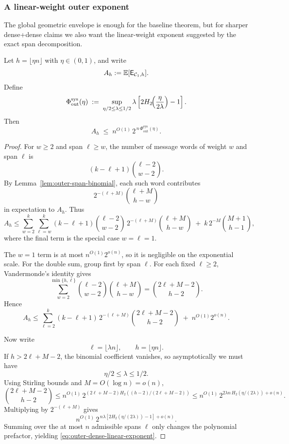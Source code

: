 \subsubsection{A linear-weight outer exponent}
\label{sec:outer-dense-linear-exponent}

The global geometric envelope is enough for the baseline theorem, but for sharper dense+dense claims we also want
the linear-weight exponent suggested by the exact span decomposition.

\begin{theorem}
\label{thm:outer-dense-linear-exponent}
Let \(h=\lfloor \eta n\rfloor\) with \(\eta\in(0,1)\), and write
\[
A_h:=\mathbb{E}[\mathsf{E}_{{\mathcal{C}_1},h}].
\]
Define
\begin{equation}
\label{eq:outer-dense-linear-rate-function}
\Phi_{\mathrm{out}}^{\mathrm{sys}}(\eta)
\;:=\;
\sup_{\eta/2\le \lambda\le 1/2}
\lambda
\left[
2H_2\!\Bigl(\frac{\eta}{2\lambda}\Bigr)
-1
\right].
\end{equation}
Then
\begin{equation}
\label{eq:outer-dense-linear-exponent}
A_h
\;\le\;
n^{O(1)}\,2^{\,n\,\Phi_{\mathrm{out}}^{\mathrm{sys}}(\eta)}.
\end{equation}
\end{theorem}

\begin{proof}
For \(w\ge 2\) and span \(\ell\ge w\), the number of message words of weight \(w\) and span \(\ell\) is
\[
(k-\ell+1)\binom{\ell-2}{w-2}.
\]
By Lemma~\ref{lem:outer-span-binomial}, each such word contributes
\[
2^{-(\ell+M)}\binom{\ell+M}{h-w}
\]
in expectation to \(A_h\).
Thus
\[
A_h
\le
\sum_{w=2}^{k}\sum_{\ell=w}^{k}
(k-\ell+1)\binom{\ell-2}{w-2}\,
2^{-(\ell+M)}\binom{\ell+M}{h-w}
\;+\;k\,2^{-M}\binom{M+1}{h-1},
\]
where the final term is the special case \(w=\ell=1\).

The \(w=1\) term is at most \(n^{O(1)}2^{o(n)}\), so it is negligible on the exponential scale.
For the double sum, group first by span \(\ell\).
For each fixed \(\ell\ge 2\), Vandermonde's identity gives
\[
\sum_{w=2}^{\min\{h,\ell\}}
\binom{\ell-2}{w-2}\binom{\ell+M}{h-w}
=
\binom{2\ell+M-2}{h-2}.
\]
Hence
\[
A_h
\le
\sum_{\ell=2}^{k}
(k-\ell+1)\,2^{-(\ell+M)}\binom{2\ell+M-2}{h-2}
\;+\;n^{O(1)}2^{o(n)}.
\]

Now write
\[
\ell=\lfloor \lambda n\rfloor,
\qquad
h=\lfloor \eta n\rfloor.
\]
If \(h>2\ell+M-2\), the binomial coefficient vanishes, so asymptotically we must have
\[
\eta/2\le \lambda\le 1/2.
\]
Using Stirling bounds and \(M=O(\log n)=o(n)\),
\[
\binom{2\ell+M-2}{h-2}
\le
n^{O(1)}\,2^{(2\ell+M-2)H_2((h-2)/(2\ell+M-2))}
\le
n^{O(1)}\,2^{2\lambda n\,H_2(\eta/(2\lambda))+o(n)}.
\]
Multiplying by \(2^{-(\ell+M)}\) gives
\[
n^{O(1)}\,
2^{\,n\lambda\left[
2H_2(\eta/(2\lambda))-1
\right]+o(n)}.
\]
Summing over the at most \(n\) admissible spans \(\ell\) only changes the polynomial prefactor, yielding
\eqref{eq:outer-dense-linear-exponent}.
\end{proof}

